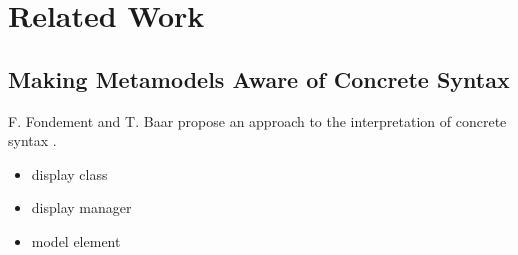 \chapter{Related Work}


\section{Making Metamodels Aware of Concrete Syntax}
\label{sec:fondement}
F. Fondement and T. Baar propose an approach to the interpretation of concrete syntax \cite{fondement_making_2005}. 


\cite{baar_correctly_2008}
\begin{itemize}
  \item display class
  \item display manager
  \item model element
\end{itemize}